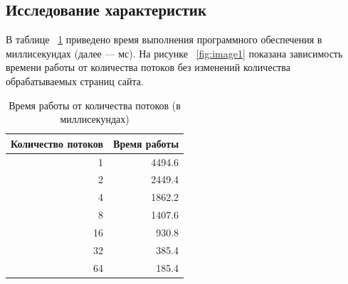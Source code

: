 \subsection{Исследование характеристик}

В таблице ~\ref{tbl:time_measurements1} приведено время выполнения
программного обеспечения в миллисекундах (далее --- мс). На рисунке
~\ref{fig:image1} показана зависимость времени работы от количества
потоков без изменений количества обрабатываемых страниц сайта.

\begin{table}[h]
	\begin{center}
		\begin{threeparttable}
		\captionsetup{justification=raggedright,singlelinecheck=off}
		\caption{Время работы от количества потоков (в миллисекундах)}
		\label{tbl:time_measurements1}
                    \begin{tabular}{|r|r|}
                        \hline
                        Количество потоков & Время работы\\
                        \hline
                        1 & 4494.6 \\
                         \hline
                        2 & 2449.4 \\
                         \hline
                        4 & 1862.2 \\
                         \hline
                        8 & 1407.6 \\
                         \hline
                        16 & 930.8 \\
                         \hline
                        32 & 385.4 \\
                         \hline
                        64 & 185.4 \\
                         \hline
                    \end{tabular}
		\end{threeparttable}
    \end{center}
\end{table}

